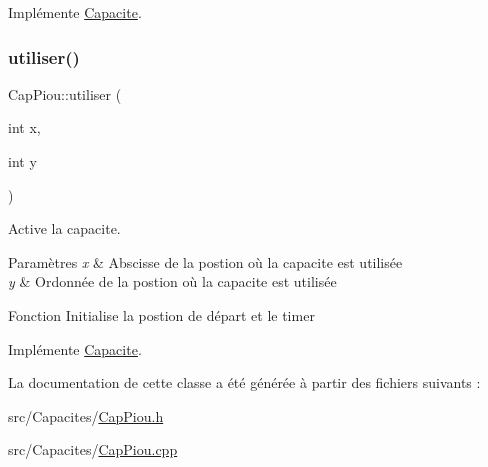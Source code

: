 Implémente \hyperlink{class_capacite_a924214972f385ef409031bafc0f315b7}{Capacite}.

\mbox{\label{class_cap_piou_a92f5cc3011280ad13bf3ff5e6a3c76ea}} 
\subsubsection{\texorpdfstring{utiliser()}{utiliser()}}
{\footnotesize\ttfamily Cap\+Piou\+::utiliser (\begin{DoxyParamCaption}\item[{int}]{x,  }\item[{int}]{y }\end{DoxyParamCaption})\hspace{0.3cm}{\ttfamily [virtual]}}



Active la capacite. 


\begin{DoxyParams}{Paramètres}
{\em x} & Abscisse de la postion où la capacite est utilisée \\
\hline
{\em y} & Ordonnée de la postion où la capacite est utilisée\\
\hline
\end{DoxyParams}
Fonction Initialise la postion de départ et le timer 

Implémente \hyperlink{class_capacite_a6f5e6efda11f80ab8538e23f5bdc6e79}{Capacite}.



La documentation de cette classe a été générée à partir des fichiers suivants \+:\begin{DoxyCompactItemize}
\item 
src/\+Capacites/\hyperlink{_cap_piou_8h}{Cap\+Piou.\+h}\item 
src/\+Capacites/\hyperlink{_cap_piou_8cpp}{Cap\+Piou.\+cpp}\end{DoxyCompactItemize}
